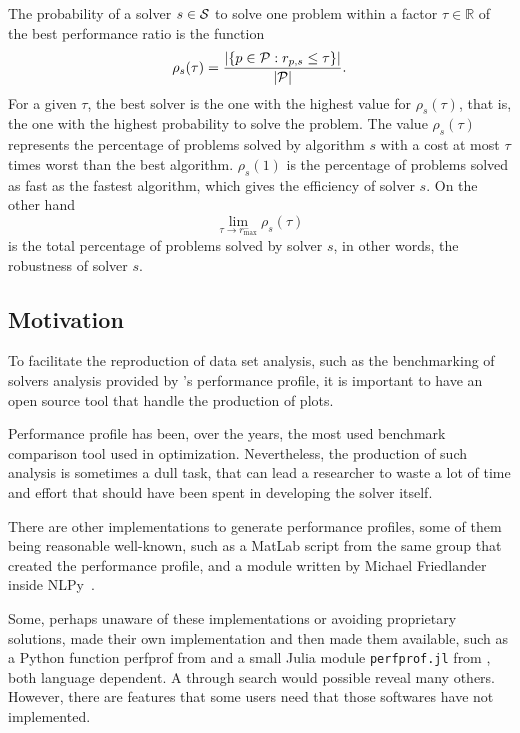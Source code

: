     The probability of a solver $s \in \mathcal{S}$  to solve one problem within a
    factor $\tau \in \mathds{R}$ of the best performance ratio is the function
    \begin{align*}
      \rho_s(\tau) = \frac{| \{p \in \mathcal{P}: r_{p,s} \leq \tau\} |}{| \mathcal{P} |}.
    \end{align*}
    For a given $\tau$, the best solver is the one with the highest value for
    $\rho_s(\tau)$, that is, the one with the highest probability to solve the
    problem.
    The value $\rho_s(\tau)$ represents the percentage of problems solved by
    algorithm $s$ with a cost at most $\tau$ times worst than the best
    algorithm. $\rho_s(1)$ is the percentage of problems solved as fast as the
    fastest algorithm, which gives the efficiency of solver $s$.
    On the other hand
    \[\displaystyle \lim_{\tau\rightarrow r^-_{\max}} \rho_s(\tau)\]
    is the total percentage of problems solved by solver $s$, in
    other words, the robustness of solver $s$.

\subsection*{Motivation}

    To facilitate the reproduction of data set analysis, such as the
    benchmarking of solvers analysis provided by \textcite{Dolan:2002du}'s
    performance profile, it is important to have an open source tool that handle
    the production of plots.

    Performance profile has been, over the years, the most used benchmark
    comparison tool used in optimization. Nevertheless, the production of such
    analysis is sometimes a dull task, that can lead a researcher to waste a lot
    of time and effort that should have been spent in developing the solver
    itself.

    There are other
    implementations to generate  performance profiles,
    some of them being reasonable well-known, such as a MatLab
    script\cite{url:cops} from
    the same group that created the performance profile,
    and a module written by
    Michael Friedlander inside
    NLPy~\cite{url:NLPy}.

    Some, perhaps unaware of these implementations or avoiding
    proprietary solutions, made their own implementation and then made them
    available, such as a Python function perfprof from \textcite{url:perfprof} 
    and a small Julia module {\tt perfprof.jl} from \textcite{url:perfprofjl}, 
    both language dependent. A through search would possible reveal many
    others.
    However, there are features that some users need that those softwares have
    not implemented.

